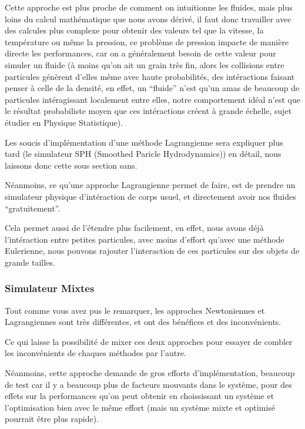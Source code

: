 \documentclass{article}
\begin{document}
Cette approche est plus proche de comment on intuitionne les fluides, mais plus loins du calcul mathématique que nous avons dérivé, il faut donc travailler avec des calcules plus complexe pour obtenir des valeurs tel que la vitesse, la température ou même la pression, ce problème de pression impacte de manière directe les performances, car on a généralement besoin de cette valeur pour simuler un fluide (à moins qu'on ait un grain très fin, alors les collisions entre particules génèrent d'elles même avec haute probabilités, des intéractions faisant penser à celle de la densité, en effet, un ``fluide'' n'est qu'un amas de beaucoup de particules intéragissant localement entre elles, notre comportement idéal n'est que le résultat probabiliste moyen que ces intéractions créent à grande échelle, sujet étudier en Physique Statistique).

Les soucis d'implémentation d'une méthode Lagrangienne sera expliquer plus tard (le simulateur SPH (Smoothed Paricle Hydrodynamics)) en détail, nous laissons donc cette sous section sans.

Néanmoins, ce qu'une approche Lagrangienne permet de faire, est de prendre un simulateur physique d'intéraction de corps usuel, et directement avoir nos fluides ``gratuitement''.

Cela permet aussi de l'étendre plus facilement, en effet, nous avons déjà l'intéraction entre petites particules, avec moins d'effort qu'avec une méthode Eulerienne, nous pouvons rajouter l'interaction de ces particules sur des objets de grande tailles.

\subsubsection{Simulateur Mixtes}

Tout comme vous avez pus le remarquer, les approches Newtoniennes et Lagrangiennes sont très différentes, et ont des bénéfices et des inconvénients.

Ce qui laisse la possibilité de mixer ces deux approches pour essayer de combler les inconvénients de chaques méthodes par l'autre.

Néanmoins, cette approche demande de gros efforts d'implémentation, beaucoup de test car il y a beaucoup plus de facteurs mouvants dans le système, pour des effets sur la performances qu'on peut obtenir en choississant un système et l'optimisation bien avec le même effort (mais un système mixte et optimisé pourrait être plus rapide).
\end{document}
